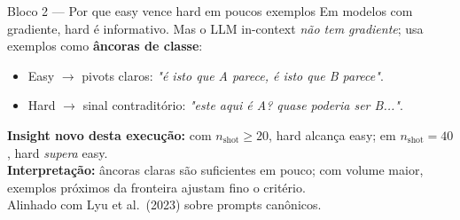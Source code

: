 \documentclass[aspectratio=169,10pt]{beamer}
\begin{document}
\begin{frame}{Bloco 2 --- Por que easy vence hard em poucos exemplos}
  \footnotesize
  Em modelos com gradiente, hard \'e informativo. Mas o LLM in-context \emph{n\~ao tem gradiente}; usa exemplos como \textbf{\^ancoras de classe}:
  \begin{itemize}
    \item Easy $\to$ pivots claros: \emph{"\'e isto que A parece, \'e isto que B parece"}.
    \item Hard $\to$ sinal contradit\'orio: \emph{"este aqui \'e A? quase poderia ser B..."}.
  \end{itemize}
  \medskip
  \textbf{Insight novo desta execu\c{c}\~ao:} com $n_{\text{shot}} \geq 20$, hard alcan\c{c}a easy; em $n_{\text{shot}}=40$, hard \emph{supera} easy.\\
  \textbf{Interpreta\c{c}\~ao:} \^ancoras claras s\~ao suficientes em pouco; com volume maior, exemplos pr\'oximos da fronteira ajustam fino o crit\'erio.\\
  Alinhado com Lyu et al.\ (2023) sobre prompts can\^onicos.
\end{frame}
\end{document}

